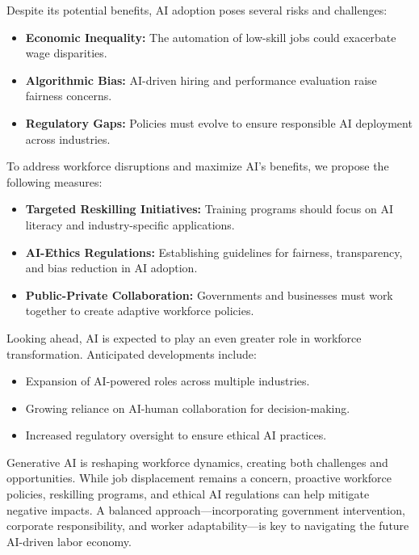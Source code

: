 \documentclass[a4paper,headinclude=on,footinclude=on,12pt,oneside]{scrbook}
\begin{document}

Despite its potential benefits, AI adoption poses several risks and challenges:
\begin{itemize}
	\item \textbf{Economic Inequality:} The automation of low-skill jobs could exacerbate wage disparities.
	\item \textbf{Algorithmic Bias:} AI-driven hiring and performance evaluation raise fairness concerns.
	\item \textbf{Regulatory Gaps:} Policies must evolve to ensure responsible AI deployment across industries.
\end{itemize}


To address workforce disruptions and maximize AI’s benefits, we propose the following measures:
\begin{itemize}
	\item \textbf{Targeted Reskilling Initiatives:} Training programs should focus on AI literacy and industry-specific applications.
	\item \textbf{AI-Ethics Regulations:} Establishing guidelines for fairness, transparency, and bias reduction in AI adoption.
	\item \textbf{Public-Private Collaboration:} Governments and businesses must work together to create adaptive workforce policies.
\end{itemize}


Looking ahead, AI is expected to play an even greater role in workforce transformation. Anticipated developments include:
\begin{itemize}
	\item Expansion of AI-powered roles across multiple industries.
	\item Growing reliance on AI-human collaboration for decision-making.
	\item Increased regulatory oversight to ensure ethical AI practices.
\end{itemize}


Generative AI is reshaping workforce dynamics, creating both challenges and opportunities. While job displacement remains a concern, proactive workforce policies, reskilling programs, and ethical AI regulations can help mitigate negative impacts. A balanced approach—incorporating government intervention, corporate responsibility, and worker adaptability—is key to navigating the future AI-driven labor economy.
\end{document}
